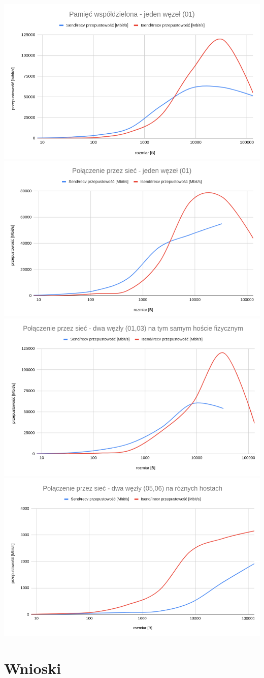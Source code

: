 \documentclass[10pt,english, openany]{book}
\begin{document}
\centering \includegraphics[scale=0.65]{pics/z1.png}    
\centering \includegraphics[scale=0.63]{pics/z2.png}    
\centering \includegraphics[scale=0.63]{pics/z3.png}    
\centering \includegraphics[scale=0.6]{pics/z4.png}    

\chapter{Wnioski}
\end{document}
